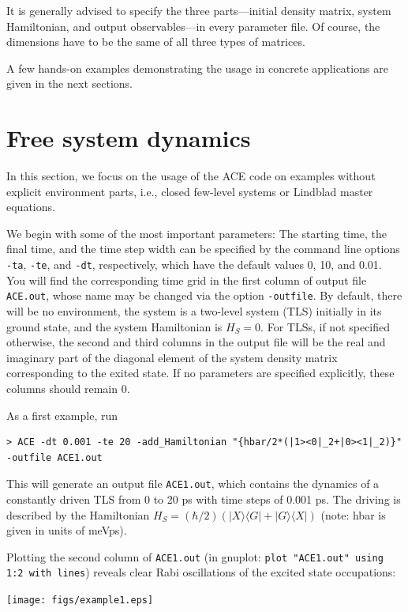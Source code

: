 \documentclass{scrartcl}
\begin{document}
It is generally advised to specify the three parts---initial 
density matrix, system Hamiltonian, and output observables---in every 
parameter file. Of course, the dimensions have to be the same of all 
three types of matrices.


A few hands-on examples demonstrating the usage in concrete applications are
given in the next sections.

\section{Free system dynamics}

In this section, we focus on the usage of the ACE code
on examples without explicit environment parts,
i.e., closed few-level systems or Lindblad master equations.

We begin with some of the most important parameters:
The starting time, the final time, and the time step width can be specified
by the command line options \texttt{-ta}, \texttt{-te}, and \texttt{-dt}, 
respectively, which have the default values 0, 10, and 0.01.
You will find the corresponding time grid in the first column of output file
\texttt{ACE.out}, whose name may be changed via the option \texttt{-outfile}.
By default, there will be no environment, the system is a two-level system
(TLS) initially in its ground state, and the system Hamiltonian is $H_S=0$. 
For TLSs, if not specified otherwise, the second and third
columns in the output file will be the real and imaginary part of the 
diagonal element of the system density matrix corresponding to the exited state.
If no parameters are specified explicitly, these columns should remain 0.

As a first example, run
\begin{verbatim}
> ACE -dt 0.001 -te 20 -add_Hamiltonian "{hbar/2*(|1><0|_2+|0><1|_2)}" -outfile ACE1.out
\end{verbatim}
This will generate an output file \texttt{ACE1.out}, which contains the dynamics
of a constantly driven TLS from 0 to 20 ps with time steps of 0.001 ps.
The driving is described by the Hamiltonian 
$H_S=(\hbar/2)(|X\rangle\langle G|+|G\rangle\langle X|)$ (note: hbar is given
in units of meVps).

Plotting the second column of \texttt{ACE1.out} 
(in gnuplot: \verb+plot "ACE1.out" using 1:2 with lines+) reveals clear 
Rabi oscillations of the excited state occupations:

\texttt{[image: figs/example1.eps]}
\end{document}
